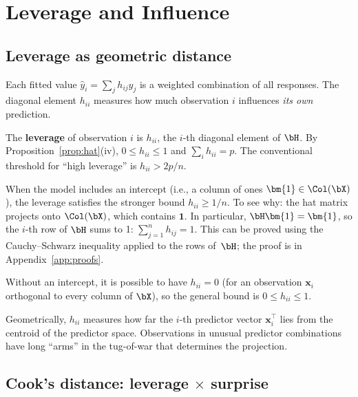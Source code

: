 
\section{Leverage and Influence}\label{sec:leverage}

\subsection{Leverage as geometric distance}

Each fitted value $\hat{y}_i = \sum_j h_{ij}y_j$ is a weighted
combination of all responses. The diagonal element $h_{ii}$
measures how much observation $i$ influences \emph{its own} prediction.

\begin{definition}
The \textbf{leverage} of observation $i$ is $h_{ii}$, the $i$-th diagonal
element of $\bH$. By Proposition~\ref{prop:hat}(iv),
$0 \le h_{ii} \le 1$ and $\sum_i h_{ii} = p$.
The conventional threshold for ``high leverage'' is $h_{ii} > 2p/n$.
\end{definition}

\begin{remark}\label{rem:hii-intercept}
When the model includes an intercept (i.e., a column of ones $\bm{1}\in\Col(\bX)$),
the leverage satisfies the stronger bound $h_{ii}\ge 1/n$.
To see why: the hat matrix projects onto $\Col(\bX)$, which contains $\bm{1}$.
In particular, $\bH\bm{1} = \bm{1}$, so the $i$-th row of $\bH$ sums to 1:
$\sum_{j=1}^n h_{ij} = 1$.
This can be proved using the Cauchy--Schwarz inequality applied to the
rows of~$\bH$; the proof is in Appendix~\ref{app:proofs}.

Without an intercept, it is possible to have $h_{ii} = 0$ (for an observation
$\bm{x}_i$ orthogonal to every column of $\bX$), so the general bound is
$0 \le h_{ii} \le 1$.
\end{remark}

Geometrically, $h_{ii}$ measures how far the $i$-th predictor vector
$\bm{x}_i^\top$ lies from the centroid of the predictor space.
Observations in unusual predictor combinations have long ``arms''
in the tug-of-war that determines the projection.

\subsection{Cook's distance: leverage $\times$ surprise}

